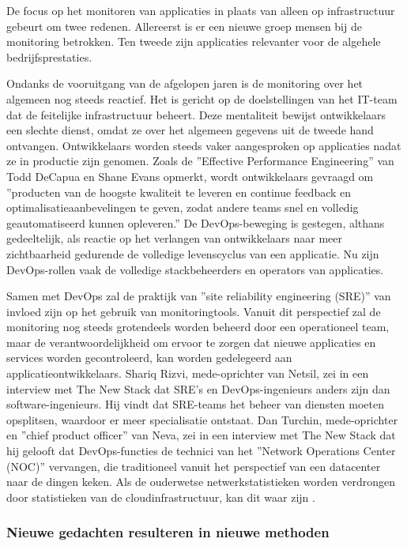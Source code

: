 De focus op het monitoren van applicaties in plaats van alleen op infrastructuur gebeurt om twee redenen. Allereerst is er een nieuwe groep mensen bij de monitoring betrokken. Ten tweede zijn applicaties relevanter voor de algehele bedrijfsprestaties. 

Ondanks de vooruitgang van de afgelopen jaren is de monitoring over het algemeen nog steeds reactief. Het is gericht op de doelstellingen van het IT-team dat de feitelijke infrastructuur beheert. Deze mentaliteit bewijst ontwikkelaars een slechte dienst, omdat ze over het algemeen gegevens uit de tweede hand ontvangen. Ontwikkelaars worden steeds vaker aangesproken op applicaties nadat ze in productie zijn genomen. Zoals de ''Effective Performance Engineering'' van Todd DeCapua en Shane Evans opmerkt, wordt ontwikkelaars gevraagd om ''producten van de hoogste kwaliteit te leveren en continue feedback en optimalisatieaanbevelingen te geven, zodat andere teams snel en volledig geautomatiseerd kunnen opleveren.'' De DevOps-beweging is gestegen, althans gedeeltelijk, als reactie op het verlangen van ontwikkelaars naar meer zichtbaarheid gedurende de volledige levenscyclus van een applicatie. Nu zijn DevOps-rollen vaak de volledige stackbeheerders en operators van applicaties. 

Samen met DevOps zal de praktijk van ''site reliability engineering (SRE)'' van invloed zijn op het gebruik van monitoringtools. Vanuit dit perspectief zal de monitoring nog steeds grotendeels worden beheerd door een operationeel team, maar de verantwoordelijkheid om ervoor te zorgen dat nieuwe applicaties en services worden gecontroleerd, kan worden gedelegeerd aan applicatieontwikkelaars. Shariq Rizvi, mede-oprichter van Netsil, zei in een interview met The New Stack dat SRE's en DevOps-ingenieurs anders zijn dan software-ingenieurs. Hij vindt dat SRE-teams het beheer van diensten moeten opsplitsen, waardoor er meer specialisatie ontstaat. Dan Turchin, mede-oprichter en ''chief product officer'' van Neva, zei in een interview met The New Stack dat hij gelooft dat DevOps-functies de technici van het ''Network Operations Center (NOC)'' vervangen, die traditioneel vanuit het perspectief van een datacenter naar de dingen keken. Als de ouderwetse netwerkstatistieken worden verdrongen door statistieken van de cloudinfrastructuur, kan dit waar zijn \autocite{Williams2016}. 

\subsubsection{Nieuwe gedachten resulteren in nieuwe methoden}

